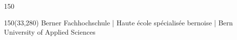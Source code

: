 \begin{titlepage}
\begin{flushleft}
\begin{textblock}{150}
\end{textblock}

\begin{textblock}{150}(33,280)
\noindent 
\color{bfhgrey}\fontsize{9pt}{10pt}\selectfont
Berner Fachhochschule | Haute \'ecole sp\'ecialis\'ee bernoise | Bern University of Applied Sciences
\color{black}\selectfont
\end{textblock}

\end{flushleft}

\end{titlepage}

\clearpage

